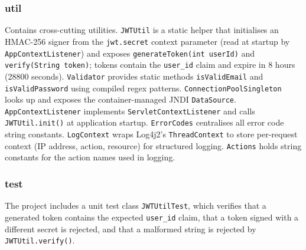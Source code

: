 \subsubsection{util}
Contains cross-cutting utilities. \texttt{JWTUtil} is a static helper that initialises an HMAC-256 signer from the \texttt{jwt.secret} context parameter (read at startup by \texttt{AppContextListener}) and exposes \texttt{generateToken(int userId)} and \texttt{verify(String token)}; tokens contain the \texttt{user\_id} claim and expire in 8 hours (28800 seconds). \texttt{Validator} provides static methods \texttt{isValidEmail} and \texttt{isValidPassword} using compiled regex patterns. \texttt{ConnectionPoolSingleton} looks up and exposes the container-managed JNDI \texttt{DataSource}. \texttt{AppContextListener} implements \texttt{ServletContextListener} and calls \texttt{JWTUtil.init()} at application startup. \texttt{ErrorCodes} centralises all error code string constants. \texttt{LogContext} wraps Log4j2's \texttt{ThreadContext} to store per-request context (IP address, action, resource) for structured logging. \texttt{Actions} holds string constants for the action names used in logging.
 
\subsubsection{test}
The project includes a unit test class \texttt{JWTUtilTest}, which verifies that a generated token contains the expected \texttt{user\_id} claim, that a token signed with a different secret is rejected, and that a malformed string is rejected by \texttt{JWTUtil.verify()}.
